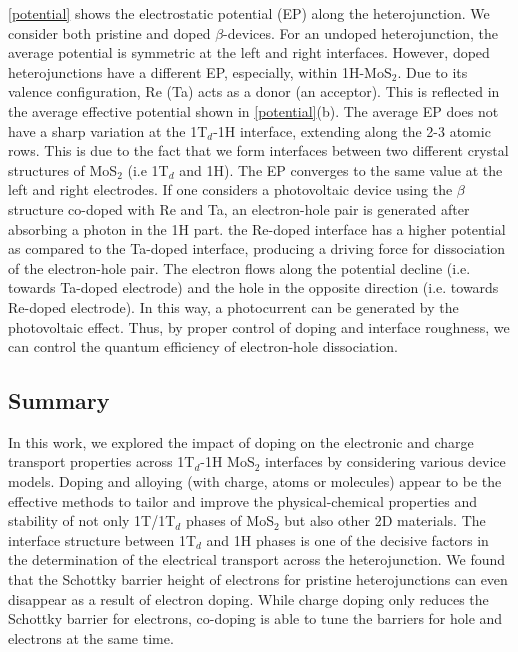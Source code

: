 \autoref{potential} shows the electrostatic potential (EP) along the heterojunction. We consider both pristine and doped $\beta$-devices. 
For an undoped heterojunction, the average potential is symmetric at the left and right interfaces.
However, doped heterojunctions have a  different EP, especially, within 1H-MoS$_2$. 
Due to its valence configuration, Re (Ta) acts as a donor (an acceptor). 
This is reflected in the average effective potential shown in \autoref{potential}(b).
The average EP does not have a sharp variation at the 1T$_d$-1H interface, extending along the 2-3 atomic rows.  
This is due to the fact that we form interfaces between two different crystal structures of MoS$_2$ (i.e 1T$_d$ and 1H). The EP converges to  the same value at the left and right electrodes. 
If one considers a photovoltaic device using the  $\beta$ structure co-doped with Re and Ta, 
an electron-hole pair is generated after absorbing a photon in the 1H part. 
the Re-doped interface has a higher potential as compared to the Ta-doped interface, producing a driving force for dissociation of the electron-hole pair. 
The electron flows along the potential decline (i.e. towards Ta-doped electrode)
and the hole in the opposite direction (i.e. towards Re-doped electrode).
In this way,  a photocurrent can be  generated by the photovoltaic effect. Thus, by proper control of doping and interface roughness, we 
can control the quantum efficiency of electron-hole dissociation\cite{doi:10.1021/acs.jpclett.7b00518}. 

\subsection{Summary}
In this work, we explored the impact of doping on the electronic and charge transport properties across 1T$_d$-1H MoS$_2$ interfaces by considering various device models. 
Doping and alloying (with charge, atoms or molecules) 
appear to be the effective methods to tailor and improve the physical-chemical properties and stability of not 
only 1T/1T$_d$ phases of MoS$_2$ but also other 2D materials. 
The interface structure between 1T$_d$ and 1H phases is one of the decisive factors in the determination of the electrical transport across the heterojunction. 
We found that the Schottky barrier height of electrons for  pristine heterojunctions  can even disappear as a result of electron doping. 
While charge doping only reduces the Schottky barrier for electrons, co-doping is able to tune the barriers for
hole and electrons at the same time.

